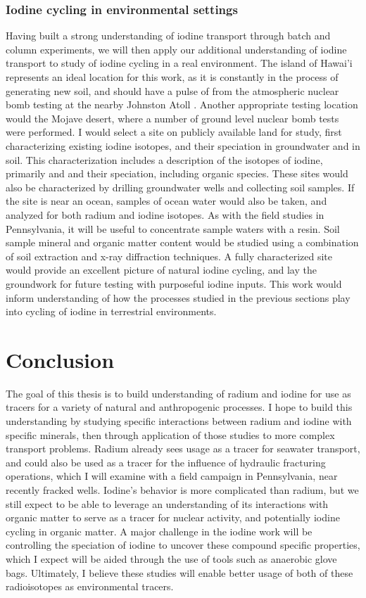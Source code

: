 \documentclass[twoside,12pt,titlepage]{article}
\newcommand{\isotope}[2]{\ch{^{#1}#2}}
\begin{document}
\subsubsection{Iodine cycling in environmental settings}
Having built a strong understanding of iodine transport through batch and column experiments, we will then apply our additional understanding of iodine transport to study of iodine cycling in a real environment. The island of Hawai'i represents an ideal location for this work, as it is constantly in the process of generating new soil, and should have a pulse of \isotope{129}{I} from the atmospheric nuclear bomb testing at the nearby Johnston Atoll \cite{WikiStarfishPrime}. Another appropriate testing location would the Mojave desert, where a number of ground level nuclear bomb tests were performed. I would select a site on publicly available land for study, first characterizing existing iodine isotopes, and their speciation in groundwater and in soil. This characterization includes a description of the isotopes of iodine, primarily \isotope{127}{I} and \isotope{129}{I} and their speciation, including organic species. These sites would also be characterized by drilling groundwater wells and collecting soil samples. If the site is near an ocean, samples of ocean water would also be taken, and analyzed for both radium and iodine isotopes. As with the field studies in Pennsylvania, it will be useful to concentrate sample waters with a resin. Soil sample mineral and organic matter content would be studied using a combination of soil extraction and x-ray diffraction techniques. A fully characterized site would provide an excellent picture of natural iodine cycling, and lay the groundwork for future testing with purposeful iodine inputs. This work would inform understanding of how the processes studied in the previous sections play into cycling of iodine in terrestrial environments.


\section{Conclusion}

The goal of this thesis is to build understanding of radium and iodine for use as tracers for a variety of natural and anthropogenic processes. I hope to build this understanding by studying specific interactions between radium and iodine with specific minerals, then through application of those studies to more complex transport problems. Radium already sees usage as a tracer for seawater transport, and could also be used as a tracer for the influence of hydraulic fracturing operations, which I will examine with a field campaign in Pennsylvania, near recently fracked wells. Iodine's behavior is more complicated than radium, but we still expect to be able to leverage an understanding of its interactions with organic matter to serve as a tracer for nuclear activity, and potentially iodine cycling in organic matter. A major challenge in the iodine work will be controlling the speciation of iodine to uncover these compound specific properties, which I expect will be aided through the use of tools such as anaerobic glove bags. Ultimately, I believe these studies will enable better usage of both of these radioisotopes as environmental tracers.



\end{document}
